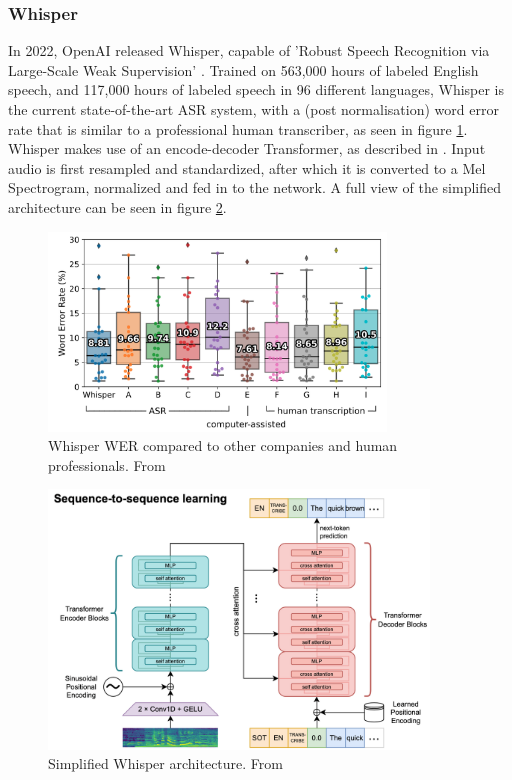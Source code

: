 \documentclass[twoside]{uva-inf-bachelor-thesis}
\begin{document}
\subsubsection{Whisper}\label{sec:whisper}
In 2022, OpenAI released Whisper, capable of 'Robust Speech Recognition via Large-Scale Weak Supervision' \cite{radford2023robust}. Trained on 563,000 hours of labeled English speech, and 117,000 hours of labeled speech in 96 different languages, Whisper is the current state-of-the-art ASR system, with a (post normalisation) word error rate that is similar to a professional human transcriber, as seen in figure \ref{fig:whisperwer}.
Whisper makes use of an encode-decoder Transformer, as described in \cite{vaswani17}. Input audio is first resampled and standardized, after which it is converted to a Mel Spectrogram, normalized and fed in to the network. A full view of the simplified architecture can be seen in figure \ref{fig:whisperarch}.

\begin{figure}
    \centering
    \includegraphics[width=0.8\textwidth]{images/whisperwer.png}
    \caption{Whisper WER compared to other companies and human professionals. From \cite{radford2023robust}}
    \label{fig:whisperwer}
\end{figure}

\begin{figure}
    \centering
    \includegraphics[width=0.9\textwidth]{images/whisperarch.png}
    \caption{Simplified Whisper architecture. From \cite{radford2023robust}}
    \label{fig:whisperarch}
\end{figure}
\end{document}
